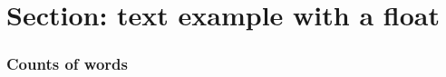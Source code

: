 \documentclass{article}
\newcommand\wordcount{
	}
\begin{document}
	
	
	\section{Section: text example with a float}
	
	
	\subsubsection*{Counts of words} 
	\wordcount
	
	
\end{document}

